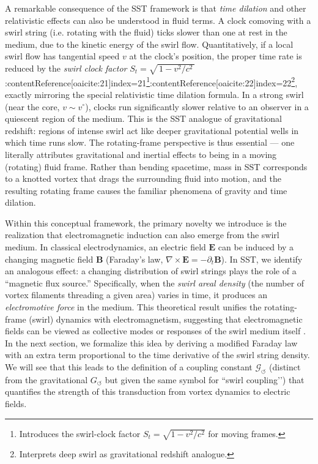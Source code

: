 \documentclass[12pt]{article}
\begin{document}
    A remarkable consequence of the SST framework is that \emph{time dilation} and other relativistic effects can also be understood in fluid terms. A clock comoving with a swirl string (i.e. rotating with the fluid) ticks slower than one at rest in the medium, due to the kinetic energy of the swirl flow. Quantitatively, if a local swirl flow has tangential speed $v$ at the clock’s position, the proper time rate is reduced by the \emph{swirl clock factor} $S_t = \sqrt{\,1 - v^2/c^2\,}$:contentReference[oaicite:21]{index=21}\footnote{Introduces the swirl-clock factor $S_t=\sqrt{1-v^2/c^2}$ for moving frames.}:contentReference[oaicite:22]{index=22}\footnote{Interprets deep swirl as gravitational redshift analogue.}, exactly mirroring the special relativistic time dilation formula. In a strong swirl (near the core, $v \sim v^{\circ}$), clocks run significantly slower relative to an observer in a quiescent region of the medium. This is the SST analogue of gravitational redshift: regions of intense swirl act like deeper gravitational potential wells in which time runs slow. The rotating-frame perspective is thus essential --- one literally attributes gravitational and inertial effects to being in a moving (rotating) fluid frame. Rather than bending spacetime, mass in SST corresponds to a knotted vortex that drags the surrounding fluid into motion, and the resulting rotating frame causes the familiar phenomena of gravity and time dilation.

    Within this conceptual framework, the primary novelty we introduce is the realization that electromagnetic induction can also emerge from the swirl medium. In classical electrodynamics, an electric field $\mathbf{E}$ can be induced by a changing magnetic field $\mathbf{B}$ (Faraday’s law, $\nabla \times \mathbf{E} = -\partial_t \mathbf{B}$). In SST, we identify an analogous effect: a changing distribution of swirl strings plays the role of a ``magnetic flux source.'' Specifically, when the \emph{swirl areal density} (the number of vortex filaments threading a given area) varies in time, it produces an \emph{electromotive force} in the medium. This theoretical result unifies the rotating-frame (swirl) dynamics with electromagnetism, suggesting that electromagnetic fields can be viewed as collective modes or responses of the swirl medium itself \cite{Iskandarani2025RotatingFrame}. In the next section, we formalize this idea by deriving a modified Faraday law with an extra term proportional to the time derivative of the swirl string density. We will see that this leads to the definition of a coupling constant $\mathcal{G}_{\!\boldsymbol{\circlearrowleft}}$ (distinct from the gravitational $G_{\!\boldsymbol{\circlearrowleft}}$ but given the same symbol for ``swirl coupling’’) that quantifies the strength of this transduction from vortex dynamics to electric fields.
\end{document}
